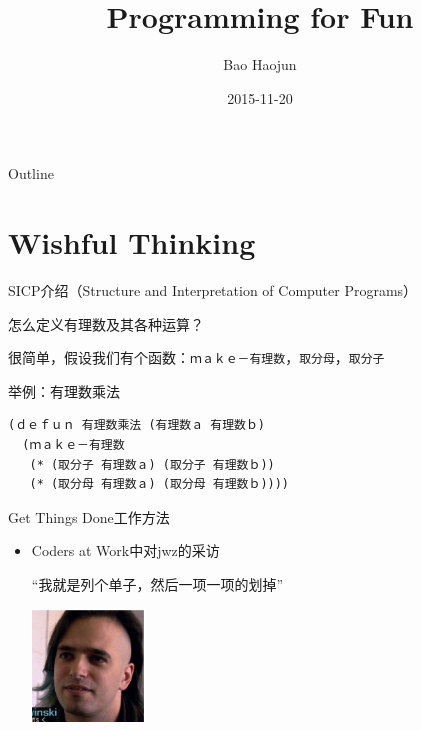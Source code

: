 \documentclass[presentation,dvipdfmx,CJKbookmarks]{beamer}
\author{Bao Haojun}
\date{2015-11-20}
\title{Programming for Fun}
\begin{document}
\begin{CJK*}{UTF8}{simsun}

\maketitle
\begin{frame}{Outline}
\tableofcontents
\end{frame}

\CJKtilde

\section{Wishful Thinking}
\label{sec:orgcc56fa3}

\begin{frame}[fragile,label={sec:org44f2b85}]{SICP\thinspace 介绍（Structure and Interpretation of Computer Programs）}
 \begin{block}{怎么定义有理数及其各种运算？}
\end{block}
\begin{block}{很简单，假设我们有\thinspace 个函数：\texttt{ｍａｋｅ－有理数}，\texttt{取分母}，\texttt{取分子}}
\end{block}
\begin{block}{举例：有理数乘法}
\begin{verbatim}
(ｄｅｆｕｎ 有理数乘法 (有理数ａ 有理数ｂ)
  (ｍａｋｅ－有理数
   (* (取分子 有理数ａ) (取分子 有理数ｂ))
   (* (取分母 有理数ａ) (取分母 有理数ｂ))))
\end{verbatim}
\end{block}
\end{frame}

\begin{frame}[label={sec:orgb84cf5c}]{Get Things Done\thinspace 工作方法}
\begin{itemize}
\item Coders at Work\thinspace 中对\thinspace jwz\thinspace 的采访

“我就是列个单子，然后一项一项的划掉”

\begin{center}
\includegraphics[width=3cm]{./jwz.ps}
\end{center}


\end{itemize}
\end{frame}
\end{CJK*}
\end{document}
